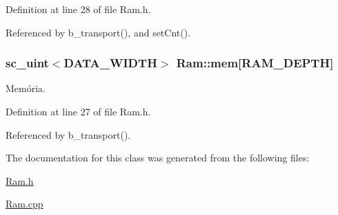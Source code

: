 Definition at line 28 of file Ram.\+h.



Referenced by b\+\_\+transport(), and set\+Cnt().

\hypertarget{classRam_ade86bafdb14f3ddb236bcf807abab45c}{
\subsubsection[{mem}]{\setlength{\rightskip}{0pt plus 5cm}sc\+\_\+uint$<${\bf D\+A\+T\+A\+\_\+\+W\+I\+D\+T\+H}$>$ Ram\+::mem\mbox{[}{\bf R\+A\+M\+\_\+\+D\+E\+P\+T\+H}\mbox{]}\hspace{0.3cm}{\ttfamily [private]}}}\label{classRam_ade86bafdb14f3ddb236bcf807abab45c}
Memória. 

Definition at line 27 of file Ram.\+h.



Referenced by b\+\_\+transport().



The documentation for this class was generated from the following files\+:\begin{DoxyCompactItemize}
\item 
\hyperlink{Ram_8h}{Ram.\+h}\item 
\hyperlink{Ram_8cpp}{Ram.\+cpp}\end{DoxyCompactItemize}
